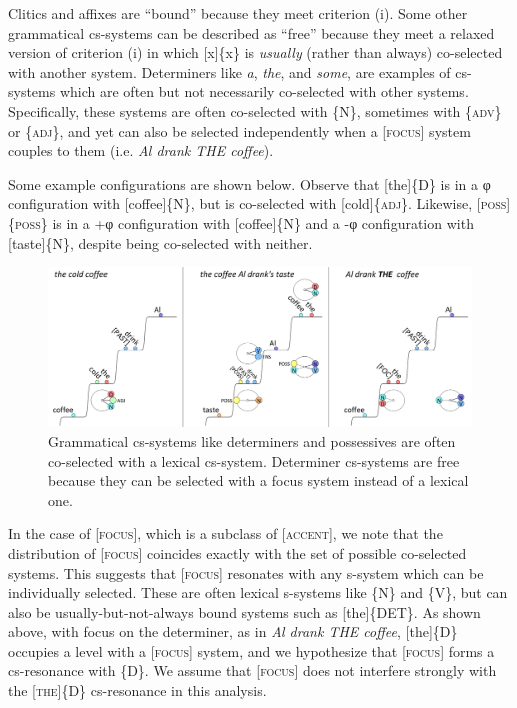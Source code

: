   Clitics and affixes are “bound” because they meet criterion (i). Some other grammatical cs-systems can be described as “free” because they meet a relaxed version of criterion (i) in which [x]\{x\} is \textit{usually} (rather than always) co-selected with another system. Determiners like \textit{a}, \textit{the}, and \textit{some}, are examples of cs-systems which are often but not necessarily co-selected with other systems. Specifically, these systems are often co-selected with \{N\}, sometimes with \{\textsc{adv}\} or \{\textsc{adj}\}, and yet can also be selected independently when a [\textsc{focus}] system couples to them (i.e. \textit{Al drank THE coffee}).

  Some example configurations are shown below. Observe that [the]\{\textsc{D}\} is in a φ configuration with [coffee]\{N\}, but is co-selected with [cold]\{\textsc{adj}\}. Likewise, [\textsc{poss}]\{\textsc{poss}\} is in a +φ configuration with [coffee]\{N\} and a -φ configuration with [taste]\{N\}, despite being co-selected with neither. 

  
\begin{figure}
\includegraphics[width=\textwidth]{figures/Tilsen-img68.png}
\caption{Grammatical cs-systems like determiners and possessives are often co-selected with a lexical cs-system. Determiner cs-systems are free because they can be selected with a focus system instead of a lexical one.}
\label{fig:4:18}
\end{figure}
 

  In the case of [\textsc{focus}], which is a subclass of [\textsc{accent}], we note that the distribution of [\textsc{focus}] coincides exactly with the set of possible co-selected systems. This suggests that [\textsc{focus}] resonates with any s-system which can be individually selected. These are often lexical s-systems like \{N\} and \{V\}, but can also be usually-but-not-always bound systems such as [the]\{DET\}. As shown above, with focus on the determiner, as in \textit{Al drank THE coffee}, [the]\{D\} occupies a level with a [\textsc{focus}] system, and we hypothesize that [\textsc{focus}] forms a cs-resonance with \{D\}. We assume that [\textsc{focus}] does not interfere strongly with the [\textsc{the}]\{D\} cs-resonance in this analysis.

